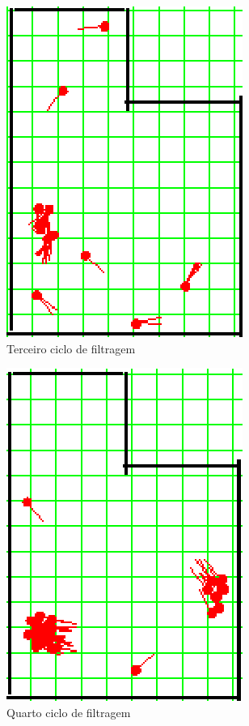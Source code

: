\begin{figure}[H]
  \centering
  \includegraphics[scale=1]{figuras/cen2_ex5/4.eps}
  \caption[Terceiro Ciclo de Filtragem]{Terceiro ciclo de filtragem}
  \label{img:cen2_ex5_4}
\end{figure}

\begin{figure}[H]
  \centering
  \includegraphics[scale=1]{figuras/cen2_ex5/5.eps}
  \caption[Quarto Ciclo de Filtragem]{Quarto ciclo de filtragem}
  \label{img:cen2_ex5_5}
\end{figure}

